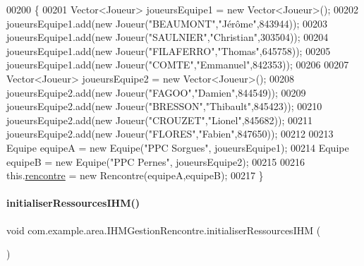 \begin{DoxyCode}
00200     \{
00201         Vector<Joueur> joueursEquipe1 = \textcolor{keyword}{new} Vector<Joueur>();
00202         joueursEquipe1.add(\textcolor{keyword}{new} Joueur(\textcolor{stringliteral}{"BEAUMONT"},\textcolor{stringliteral}{"Jérôme"},843944));
00203         joueursEquipe1.add(\textcolor{keyword}{new} Joueur(\textcolor{stringliteral}{"SAULNIER"},\textcolor{stringliteral}{"Christian"},303504));
00204         joueursEquipe1.add(\textcolor{keyword}{new} Joueur(\textcolor{stringliteral}{"FILAFERRO"},\textcolor{stringliteral}{"Thomas"},645758));
00205         joueursEquipe1.add(\textcolor{keyword}{new} Joueur(\textcolor{stringliteral}{"COMTE"},\textcolor{stringliteral}{"Emmanuel"},842353));
00206 
00207         Vector<Joueur> joueursEquipe2 = \textcolor{keyword}{new} Vector<Joueur>();
00208         joueursEquipe2.add(\textcolor{keyword}{new} Joueur(\textcolor{stringliteral}{"FAGOO"},\textcolor{stringliteral}{"Damien"},844549));
00209         joueursEquipe2.add(\textcolor{keyword}{new} Joueur(\textcolor{stringliteral}{"BRESSON"},\textcolor{stringliteral}{"Thibault"},845423));
00210         joueursEquipe2.add(\textcolor{keyword}{new} Joueur(\textcolor{stringliteral}{"CROUZET"},\textcolor{stringliteral}{"Lionel"},845682));
00211         joueursEquipe2.add(\textcolor{keyword}{new} Joueur(\textcolor{stringliteral}{"FLORES"},\textcolor{stringliteral}{"Fabien"},847650));
00212 
00213         Equipe equipeA = \textcolor{keyword}{new} Equipe(\textcolor{stringliteral}{"PPC Sorgues"}, joueursEquipe1);
00214         Equipe equipeB = \textcolor{keyword}{new} Equipe(\textcolor{stringliteral}{"PPC Pernes"}, joueursEquipe2);
00215 
00216         this.\hyperlink{classcom_1_1example_1_1area_1_1_i_h_m_gestion_rencontre_aa3ecacbd8ab104d2a3c3f3e727ae6c5c}{rencontre} = \textcolor{keyword}{new} Rencontre(equipeA,equipeB);
00217     \}
\end{DoxyCode}
\mbox{\label{classcom_1_1example_1_1area_1_1_i_h_m_gestion_rencontre_a18b1c1a04b6070a8d90aa135ad1212b7}} 
\paragraph{\texorpdfstring{initialiser\+Ressources\+I\+H\+M()}{initialiserRessourcesIHM()}}
{\footnotesize\ttfamily void com.\+example.\+area.\+I\+H\+M\+Gestion\+Rencontre.\+initialiser\+Ressources\+I\+HM (\begin{DoxyParamCaption}{ }\end{DoxyParamCaption})\hspace{0.3cm}{\ttfamily [private]}}



